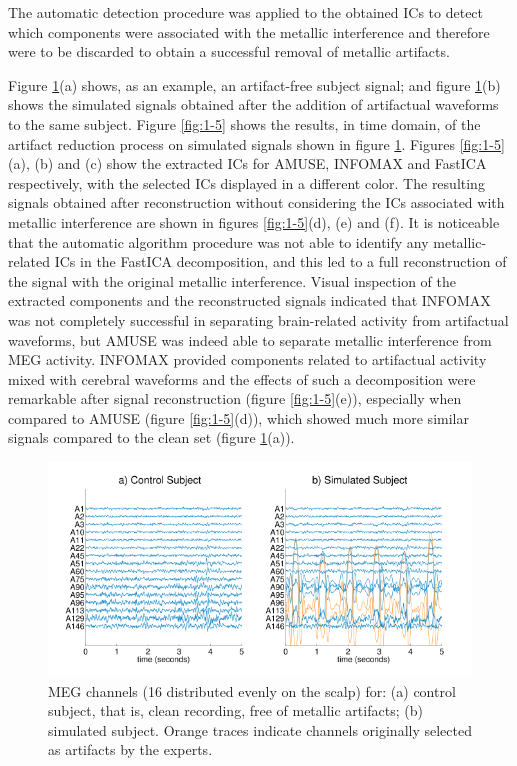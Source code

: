 The automatic detection procedure was applied to the obtained ICs to detect which components were associated with the metallic interference and therefore were to be discarded to obtain a successful removal of metallic artifacts.

Figure \ref{fig:1-4}(a) shows, as an example, an artifact-free subject signal; and figure \ref{fig:1-4}(b) shows the simulated signals obtained after the addition of artifactual waveforms to the same subject. Figure \ref{fig:1-5} shows the results, in time domain, of the artifact reduction process on simulated signals shown in figure \ref{fig:1-4}. Figures \ref{fig:1-5}(a), (b) and (c) show the extracted ICs for AMUSE, INFOMAX and FastICA respectively, with the selected ICs displayed in a different color. The resulting signals obtained after reconstruction without considering the ICs associated with metallic interference are shown in figures \ref{fig:1-5}(d), (e) and (f). It is noticeable that the automatic algorithm procedure was not able to identify any metallic-related ICs in the FastICA decomposition, and this led to a full reconstruction of the signal with the original metallic interference. Visual inspection of the extracted components and the reconstructed signals indicated that INFOMAX was not completely successful in separating brain-related activity from artifactual waveforms, but AMUSE was indeed able to separate metallic interference from MEG activity. INFOMAX provided components related to artifactual activity mixed with cerebral waveforms and the effects of such a decomposition were remarkable after signal reconstruction (figure \ref{fig:1-5}(e)), especially when compared to AMUSE (figure \ref{fig:1-5}(d)), which showed much more similar signals compared to the clean set (figure \ref{fig:1-4}(a)).

\begin{figure}[ht]
\centering
\includegraphics[width=1\textwidth]{Images/fig1-4.png}
\caption{MEG channels (16 distributed evenly on the scalp) for: (a) control subject, that is, clean recording, free of metallic artifacts; (b) simulated subject. Orange traces indicate channels originally selected as artifacts by the experts.}
\label{fig:1-4}
\end{figure}   

